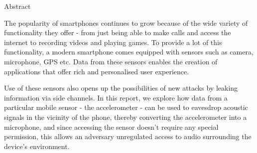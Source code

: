\begin{center}
\LARGE{Abstract}
\end{center}

\vspace{0.5in}

The popularity of smartphones continues to grow because of the wide variety of functionality they offer - from just being able to make calls and access the internet to recording videos and playing games. To provide a lot of this functionality, a modern smartphone comes equipped with sensors such as camera, microphone, GPS etc. Data from these sensors enables the creation of applications that offer rich and personalised user experience.

Use of these sensors also opens up the possibilities of new attacks by leaking information via side channels. In this report, we explore how data from a particular mobile sensor - the accelerometer - can be used to eavesdrop acoustic signals in the vicinity of the phone, thereby converting the accelerometer into a microphone, and since accessing the sensor doesn't require any special permission, this allows an adversary unregulated access to audio surrounding the device's environment.

